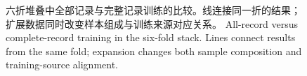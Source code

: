 \fi
\begin{figure}[htbp]\centering{}
\caption{\ifzh
六折堆叠中全部记录与完整记录训练的比较。线连接同一折的结果；扩展数据同时改变样本组成与训练来源对应关系。
\else
All-record versus complete-record training in the six-fold stack. Lines connect results from the same fold; expansion changes both sample composition and training-source alignment.
\fi}\label{fig:miss}
\end{figure}
\FloatBarrier
